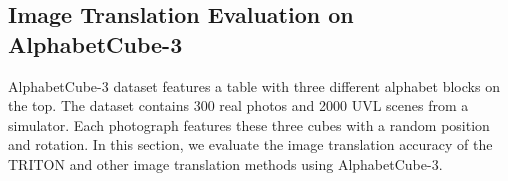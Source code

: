 \documentclass{article}
\begin{document}

	 
\subsection{Image Translation Evaluation on AlphabetCube-3}
AlphabetCube-3 dataset features a table with three different alphabet blocks on the top.
The dataset contains 300 real photos and 2000 UVL scenes from a simulator.  
Each photograph features these three cubes with a random position and rotation.
In this section, we evaluate the image translation accuracy of the TRITON and other image translation methods using AlphabetCube-3.
\end{document}
